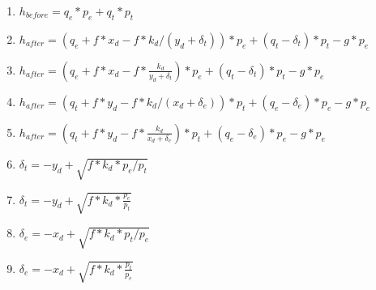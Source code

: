 \documentclass{article}
\begin{document}
\begin{enumerate}

\item $h_{before} = q_{e} \ast p_{e} + q_{t} \ast p_{t}$

\item $h_{after} = (q_{e} + f \ast x_{d}-f \ast k_d/(y_{d}+\delta_{t})) \ast p_{e} + (q_{t}-\delta_{t}) \ast p_{t} - g \ast p_e$

\item $h_{after} = \left( q_{e} + f \ast x_{d}-f \ast \frac{k_d}{y_{d}+\delta_{t}} \right) \ast p_{e} + \left( q_{t}-\delta_{t} \right) \ast p_{t} - g \ast p_e$

\item $h_{after} = (q_{t} + f \ast y_{d}-f \ast k_d/(x_{d}+\delta_{e})) \ast p_{t} + (q_{e}-\delta_{e}) \ast p_{e} - g \ast p_e$

\item $h_{after} = \left( q_{t} + f \ast y_{d}-f \ast \frac{k_d}{x_{d}+\delta_{e}} \right) \ast p_{t} + \left( q_{e}-\delta_{e} \right) \ast p_{e} - g \ast p_e$

\item $\delta_{t}=-y_d + \sqrt{f \ast k_d \ast p_e/p_t}$

\item $\delta_{t}=-y_d + \sqrt{f \ast k_d \ast \frac{p_e}{p_t}}$

\item $\delta_{e}=-x_d + \sqrt{f \ast k_d \ast p_t/p_e}$

\item $\delta_{e}=-x_d + \sqrt{f \ast k_d \ast \frac{p_t}{p_e}}$

\end{enumerate}
\end{document}
